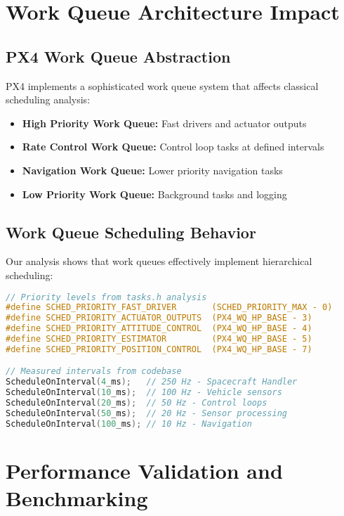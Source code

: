 \documentclass[12pt,a4paper]{article}
\begin{document}
\section{Work Queue Architecture Impact}

\subsection{PX4 Work Queue Abstraction}

PX4 implements a sophisticated work queue system that affects classical scheduling analysis:

\begin{itemize}
\item \textbf{High Priority Work Queue:} Fast drivers and actuator outputs
\item \textbf{Rate Control Work Queue:} Control loop tasks at defined intervals
\item \textbf{Navigation Work Queue:} Lower priority navigation tasks
\item \textbf{Low Priority Work Queue:} Background tasks and logging
\end{itemize}

\subsection{Work Queue Scheduling Behavior}

Our analysis shows that work queues effectively implement hierarchical scheduling:

\begin{lstlisting}[language=C, caption=PX4 Work Queue Priority Structure]
// Priority levels from tasks.h analysis
#define SCHED_PRIORITY_FAST_DRIVER       (SCHED_PRIORITY_MAX - 0)
#define SCHED_PRIORITY_ACTUATOR_OUTPUTS  (PX4_WQ_HP_BASE - 3)
#define SCHED_PRIORITY_ATTITUDE_CONTROL  (PX4_WQ_HP_BASE - 4)
#define SCHED_PRIORITY_ESTIMATOR         (PX4_WQ_HP_BASE - 5)
#define SCHED_PRIORITY_POSITION_CONTROL  (PX4_WQ_HP_BASE - 7)

// Measured intervals from codebase
ScheduleOnInterval(4_ms);   // 250 Hz - Spacecraft Handler
ScheduleOnInterval(10_ms);  // 100 Hz - Vehicle sensors
ScheduleOnInterval(20_ms);  // 50 Hz - Control loops
ScheduleOnInterval(50_ms);  // 20 Hz - Sensor processing
ScheduleOnInterval(100_ms); // 10 Hz - Navigation
\end{lstlisting}

\section{Performance Validation and Benchmarking}
\end{document}
